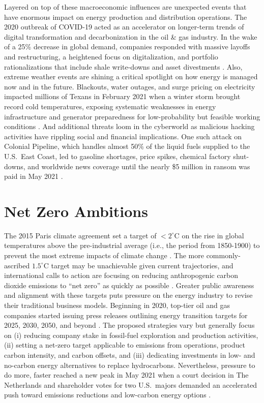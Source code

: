 Layered on top of these macroeconomic influences are unexpected events that have enormous impact on energy production and distribution operations. The 2020 outbreak of COVID-19 acted as an accelerator on longer-term trends of digital transformation and decarbonization in the oil \& gas industry. In the wake of a 25\% decrease in global demand, companies responded with massive layoffs and restructuring, a heightened focus on digitalization, and portfolio rationalizations that include shale write-downs and asset divestments \citep{deloitte_2021_2020}. Also, extreme weather events are shining a critical spotlight on how energy is managed now and in the future. Blackouts, water outages, and surge pricing on electricity impacted millions of Texans in February 2021 when a winter storm brought record cold temperatures, exposing systematic weaknesses in energy infrastructure and generator preparedness for low-probability but feasible working conditions \citep{harc_winter_2021,lazard_lazards_2020}. And additional threats loom in the cyberworld as malicious hacking activities have rippling social and financial implications. One such attack on Colonial Pipeline, which handles almost 50\% of the liquid fuels supplied to the U.S.\ East Coast, led to gasoline shortages, price spikes, chemical factory shut-downs, and worldwide news coverage until the nearly \$5 million in ransom was paid in May 2021 \citep{sanger_pipeline_2021}.

\section{Net Zero Ambitions}\label{ch1:netzero}
The 2015 Paris climate agreement set a target of $<2^\circ$C on the rise in global temperatures above the pre-industrial average (i.e., the period from 1850-1900) to prevent the most extreme impacts of climate change \citep{unfccc_paris_2015}. The more commonly-ascribed $1.5^\circ$C target may be unachievable given current trajectories, and international calls to action are focusing on reducing anthropogenic carbon dioxide emissions to ``net zero'' as quickly as possible \citep{ipcc_global_2018}. Greater public awareness and alignment with these targets puts pressure on the energy industry to revise their traditional business models. Beginning in 2020, top-tier oil and gas companies started issuing press releases outlining energy transition targets for 2025, 2030, 2050, and beyond \citep{bp_international_2020,chevron_chevron_2021,conocophillips_conocophillips_2020,equinor_equinor_2020,exxonmobil_exxonmobil_2021,shell_responsible_2020,shell_shell_2021,total_total_2020,total_2020_2021}. The proposed strategies vary but generally focus on (i) reducing company stake in fossil-fuel exploration and production activities, (ii) setting a net-zero target applicable to emissions from operations, product carbon intensity, and carbon offsets, and (iii) dedicating investments in low- and no-carbon energy alternatives to replace hydrocarbons. Nevertheless, pressure to do more, faster reached a new peak in May 2021 when a court decision in The Netherlands and shareholder votes for two U.S.\ majors demanded an accelerated push toward emissions reductions and low-carbon energy options \citep{mcwilliams_investors_2021}.

